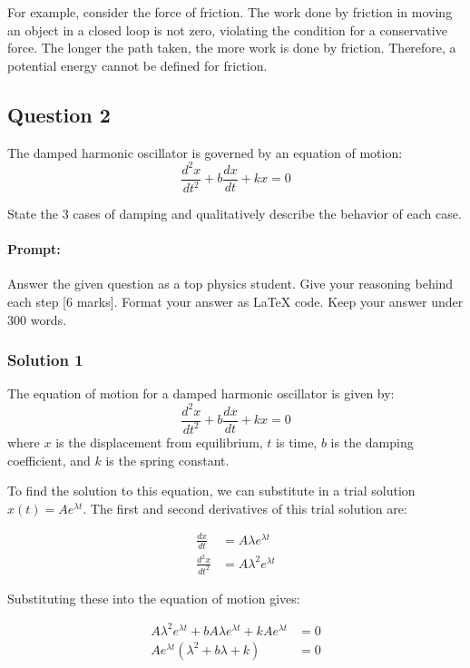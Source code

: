 \documentclass{article}
\begin{document}
For example, consider the force of friction.  The work done by friction in moving an object in a closed loop is not zero, violating the condition for a conservative force. The longer the path taken, the more work is done by friction.  Therefore, a potential energy cannot be defined for friction.

\subsection{Question 2}
The damped harmonic oscillator is governed by an equation of motion:
\[
\frac{d^2x}{dt^2} + b\frac{dx}{dt} + kx = 0
\]

State the 3 cases of damping and qualitatively describe the behavior of each case.

\paragraph{Prompt: \\} 
Answer the given question as a top physics student. Give your reasoning behind each step [6 marks].
Format your answer as LaTeX code. Keep your answer under 300 words.

\subsubsection{Solution 1}
The equation of motion for a damped harmonic oscillator is given by:
\begin{equation*}
\frac{d^2x}{dt^2} + b\frac{dx}{dt} + kx = 0
\end{equation*}
where $x$ is the displacement from equilibrium, $t$ is time, $b$ is the damping coefficient, and $k$ is the spring constant.

To find the solution to this equation, we can substitute in a trial solution $x(t) = Ae^{\lambda t}$. The first and second derivatives of this trial solution are:

\begin{align*}
\frac{dx}{dt} &= A \lambda e^{\lambda t} \\
\frac{d^2x}{dt^2} &= A \lambda^2 e^{\lambda t}
\end{align*}

Substituting these into the equation of motion gives:

\begin{align*}
A \lambda^2 e^{\lambda t} + b A \lambda e^{\lambda t} + k A e^{\lambda t} &= 0 \\
A e^{\lambda t} (\lambda^2 + b \lambda + k) &= 0
\end{align*}
\end{document}
